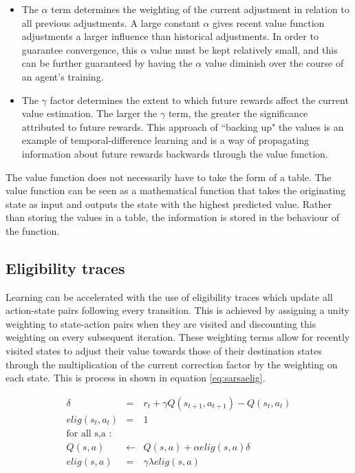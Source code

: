 \documentclass{rucsthesis}
\begin{document}
\begin{itemize}
\item{The $\alpha$ term determines the weighting of the current adjustment in relation to all previous adjustments. A large constant $\alpha$ gives recent value function adjustments a larger influence than historical adjustments. In order to guarantee convergence, this $\alpha$ value must be kept relatively small, and this can be further guaranteed by having the $\alpha$ value diminish over the course of an agent's training.}
\item{The $\gamma$ factor determines the extent to which future rewards affect the current value estimation. The larger the $\gamma$ term, the greater the significance attributed to future rewards. This approach of ``backing up" the values is an example of temporal-difference learning \citep{suttonbarto} and is a way of propagating information about future rewards backwards through the value function.}
\end{itemize}

The value function does not necessarily have to take the form of a table. The value function can be seen as a mathematical function that takes the originating state as input and outputs the state with the highest predicted value. Rather than storing the values in a table, the information is stored in the behaviour of the function.

\subsection{Eligibility traces}

Learning can be accelerated with the use of eligibility traces which update all action-state pairs following every transition.  This is achieved by assigning a unity weighting to state-action pairs when they are visited and discounting this weighting on every subsequent iteration. These weighting terms allow for recently visited states to adjust their value towards those of their destination states through the multiplication of the current correction factor by the weighting on each state. This is process in shown in equation \ref{eq:sarsaelig}.

\begin{eqnarray*}
\delta & = & r_{t} + \gamma Q(s_{t+1},a_{t+1}) - Q(s_t,a_t) \\
elig(s_t,a_t) & = & 1 \\
 \textrm{for all s,a : } & &  \\
Q(s,a) & \leftarrow & Q(s,a) + \alpha elig(s,a) \delta \label{eq:sarsaelig} \\
elig(s,a) & = & \gamma \lambda elig(s,a)
\end{eqnarray*}
\end{document}
